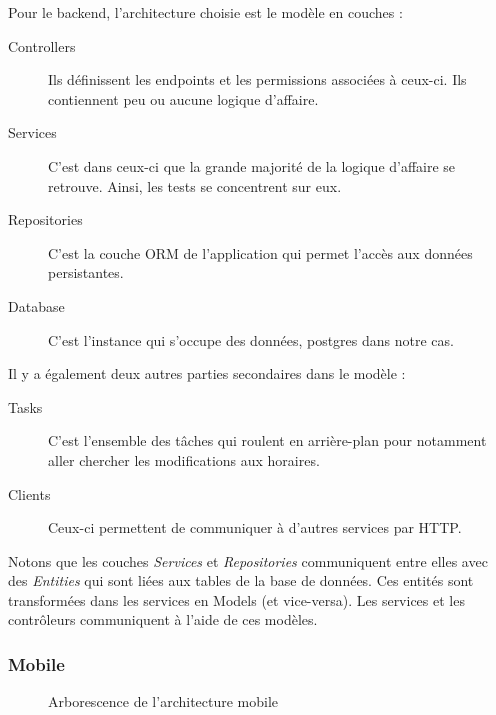         Pour le backend, l'architecture choisie est le modèle en couches :
        \begin{description}
            \item[Controllers] Ils définissent les endpoints et les permissions associées à ceux-ci. Ils contiennent peu ou aucune logique d'affaire.
            \item[Services] C'est dans ceux-ci que la grande majorité de la logique d'affaire se retrouve. Ainsi, les tests se concentrent sur eux.
            \item[Repositories] C'est la couche ORM de l'application qui permet l'accès aux données persistantes.
            \item[Database] C'est l'instance qui s'occupe des données, postgres dans notre cas.
        \end{description}

        Il y a également deux autres parties secondaires dans le modèle :
        \begin{description}
            \item[Tasks] C'est l'ensemble des tâches qui roulent en arrière-plan pour notamment aller chercher les modifications aux horaires.
            \item[Clients] Ceux-ci permettent de communiquer à d'autres services par HTTP.
        \end{description}

        Notons que les couches \emph{Services} et \emph{Repositories} communiquent entre elles avec des \emph{Entities} qui sont liées aux tables de la base de données. Ces entités sont transformées dans les services en Models (et vice-versa). Les services et les contrôleurs communiquent à l'aide de ces modèles.
        
        \subsubsection{Mobile}
        \begin{figure}[hp]
            \caption{Arborescence de l'architecture mobile}
            \label{fig.architectureMobile}
        \end{figure}        
        
